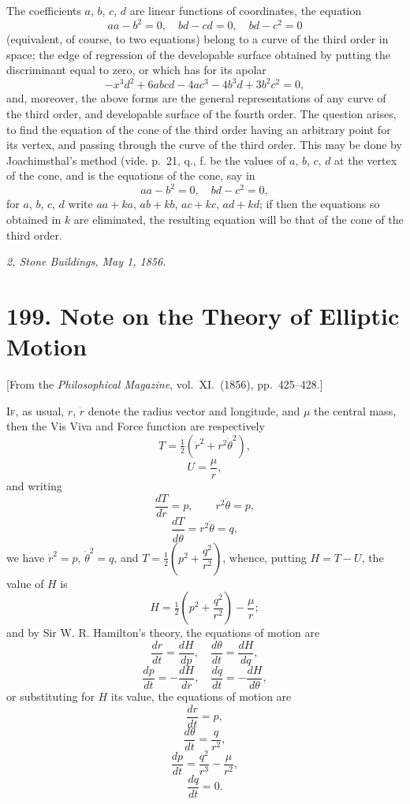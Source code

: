 \documentclass[12pt,a4paper]{article}
\theoremstyle{definition}
\begin{document}

\medskip

The coefficients $a$, $b$, $c$, $d$ are linear functions of coordinates, the equation
\[
aa-b^2 = 0,\quad bd - cd = 0,\quad bd - c^2 = 0
\]
(equivalent, of course, to two equations) belong to a curve of the third order in space;
the edge of regression of the developable surface obtained by putting the discriminant
equal to zero, or which has for its apolar
\[
-x^3d^2 + 6abcd - 4ac^3 - 4b^3d + 3b^2c^2 = 0,
\]
and, moreover, the above forms are the general representations of any curve of the
third order, and developable surface of the fourth order. The question arises, to find
the equation of the cone of the third order having an arbitrary point for its vertex,
and passing through the curve of the third order. This may be done by Joachimsthal's
method (vide. p.~21, q., f. be the values of $a$, $b$, $c$, $d$ at the vertex of the cone, and is
the equations of the cone, say in
\[
aa - b^2 = 0,\quad bd - c^2 = 0,
\]
for $a$, $b$, $c$, $d$ write $aa + ka$, $ab + kb$, $ac + kc$, $ad + kd$; if then the equations so obtained
in $k$ are eliminated, the resulting equation will be that of the cone of the third order.

\bigskip

\noindent\textit{2, Stone Buildings, May 1, 1856.}

\newpage


\section*{199. Note on the Theory of Elliptic Motion}

\begin{center}
[From the \textit{Philosophical Magazine}, vol.~XI.~(1856), pp.~425--428.]
\end{center}

\bigskip

I\textsc{f}, as usual, $r$, $\dot{r}$ denote the radius vector and longitude, and $\mu$ the central mass,
then the Vis Viva and Force function are respectively
\[
T = \tfrac{1}{2}(\dot{r}^2 + r^2\dot{\theta}^2),
\]
\[
U = \frac{\mu}{r},
\]
and writing
\[
\frac{dT}{d\dot{r}} = p,\qquad r^2\dot{\theta} = p,
\]
\[
\frac{dT}{d\dot{\theta}} = r^2\dot{\theta} = q,
\]
we have $\dot{r}^2 = p$, $\dot{\theta}^2 = q$, and $T = \tfrac{1}{2}\left(p^2 + \dfrac{q^2}{r^2}\right)$, whence, putting $H = T - U$, the value of
$H$ is
\[
H = \tfrac{1}{2}\left(p^2 + \frac{q^2}{r^2}\right) - \frac{\mu}{r};
\]
and by Sir W. R. Hamilton's theory, the equations of motion are
\[
\frac{dr}{dt} = \frac{dH}{dp},\quad \frac{d\theta}{dt} = \frac{dH}{dq},
\]
\[
\frac{dp}{dt} = -\frac{dH}{dr},\quad \frac{dq}{dt} = -\frac{dH}{d\theta},
\]
or substituting for $H$ its value, the equations of motion are
\[
\frac{dr}{dt} = p,
\]
\[
\frac{d\theta}{dt} = \frac{q}{r^2},
\]
\[
\frac{dp}{dt} = \frac{q^2}{r^3} - \frac{\mu}{r^2},
\]
\[
\frac{dq}{dt} = 0.
\]
\end{document}
